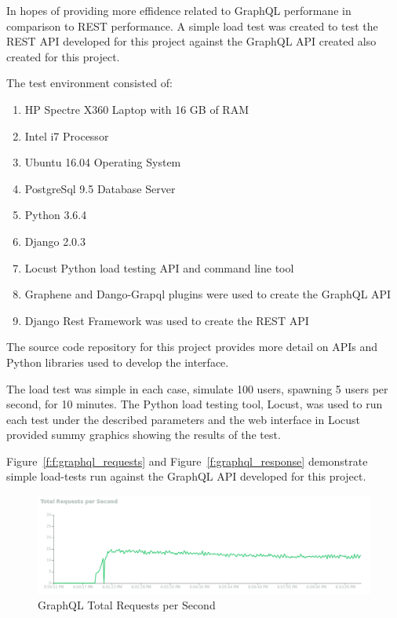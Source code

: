 In hopes of providing more effidence related to GraphQL performane in 
comparison to REST performance.  A simple load test was created to test 
the REST API developed for this project against the GraphQL API created also 
created for this project.

The test environment consisted of:
\begin{enumerate}
\item HP Spectre X360 Laptop with 16 GB of RAM
\item Intel i7 Processor
\item Ubuntu 16.04 Operating System
\item PostgreSql 9.5 Database Server
\item Python 3.6.4
\item Django 2.0.3
\item Locust Python load testing API and command line tool
\item Graphene and Dango-Grapql plugins were used to create the GraphQL API
\item Django Rest Framework was used to create the REST API
\end{enumerate}
The source code repository for this project provides more detail on APIs and 
Python libraries used to develop the interface.

The load test was simple in each case, simulate 100 users, spawning 5 users 
per second, for 10 minutes.  The Python load testing tool, Locust, was used 
to run each test under the described parameters and the web interface in 
Locust provided summy graphics showing the results of the test.

Figure~\ref{f:f:graphql_requests} and Figure~\ref{f:graphql_response} 
demonstrate simple load-tests run against the GraphQL API developed for this 
project.

\begin{figure}[htb]
  \centering\includegraphics[width=\columnwidth]
  {./images/graphql_requests.png}
  \caption{GraphQL Total Requests per Second}\label{f:graphql_requests}
\end{figure}

